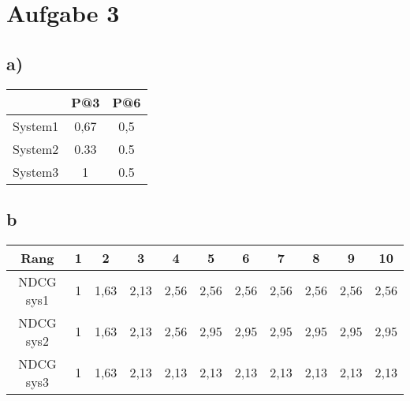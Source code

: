 \section*{Aufgabe 3}

\subsection*{a)}
\begin{center}
\begin{tabular}{|c|c|c|}
\hline & P@3 & P@6\\
\hline System1 & 0,67 & 0,5 \\
\hline System2 & 0.33 & 0.5 \\
\hline System3 & 1 & 0.5 \\
\hline
\end{tabular}
\end{center}

\subsection*{b}
\begin{tabular}{|c|c|c||c|c|c||c|c|c||c|c|}
\hline Rang 	& 1 & 2 	& 3 & 4 & 5 & 6 & 7 & 8 & 9 & 10\\
\hline NDCG sys1& 1 & 1,63& 2,13& 2,56& 2,56& 2,56& 2,56& 2,56& 2,56& 2,56\\
\hline NDCG sys2& 1 & 1,63& 2,13& 2,56& 2,95& 2,95& 2,95& 2,95& 2,95& 2,95\\
\hline NDCG sys3& 1 & 1,63& 2,13& 2,13& 2,13& 2,13& 2,13& 2,13& 2,13& 2,13\\
\hline
\end{tabular}